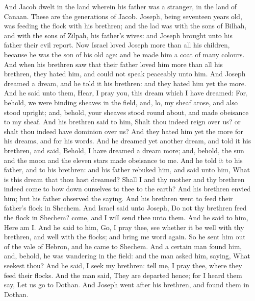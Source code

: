 \begin{biblechapter} %
 And Jacob dwelt in the land wherein his father was a stranger, in the land of Canaan.
\verse These are the generations of Jacob. Joseph, being seventeen years old, was feeding the flock with his brethren; and the lad was with the sons of Bilhah, and with the sons of Zilpah, his father's wives: and Joseph brought unto his father their evil report.
\verse Now Israel loved Joseph more than all his children, because he was the son of his old age: and he made him a coat of many colours.
\verse And when his brethren saw that their father loved him more than all his brethren, they hated him, and could not speak peaceably unto him.
\verse And Joseph dreamed a dream, and he told it his brethren: and they hated him yet the more.
\verse And he said unto them, Hear, I pray you, this dream which I have dreamed:
\verse For, behold, we were binding sheaves in the field, and, lo, my sheaf arose, and also stood upright; and, behold, your sheaves stood round about, and made obeisance to my sheaf.
\verse And his brethren said to him, Shalt thou indeed reign over us? or shalt thou indeed have dominion over us? And they hated him yet the more for his dreams, and for his words.
\verse And he dreamed yet another dream, and told it his brethren, and said, Behold, I have dreamed a dream more; and, behold, the sun and the moon and the eleven stars made obeisance to me.
\verse And he told it to his father, and to his brethren: and his father rebuked him, and said unto him, What is this dream that thou hast dreamed? Shall I and thy mother and thy brethren indeed come to bow down ourselves to thee to the earth?
\verse And his brethren envied him; but his father observed the saying.
 And his brethren went to feed their father's flock in Shechem.
\verse And Israel said unto Joseph, Do not thy brethren feed the flock in Shechem? come, and I will send thee unto them. And he said to him, Here am I.
\verse And he said to him, Go, I pray thee, see whether it be well with thy brethren, and well with the flocks; and bring me word again. So he sent him out of the vale of Hebron, and he came to Shechem.
\verse And a certain man found him, and, behold, he was wandering in the field: and the man asked him, saying, What seekest thou?
\verse And he said, I seek my brethren: tell me, I pray thee, where they feed their flocks.
\verse And the man said, They are departed hence; for I heard them say, Let us go to Dothan. And Joseph went after his brethren, and found them in Dothan.

\end{biblechapter}
